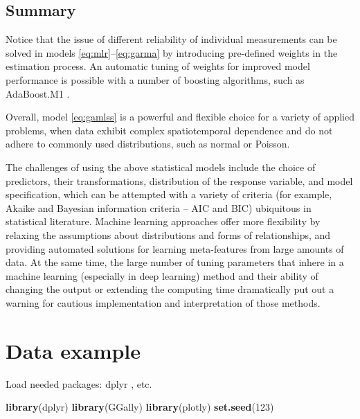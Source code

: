 \documentclass[
]{book}
\newenvironment{Shaded}{\begin{snugshade}}{\end{snugshade}}
\newcommand{\DecValTok}[1]{\textcolor[rgb]{0.00,0.00,0.81}{#1}}
\newcommand{\KeywordTok}[1]{\textcolor[rgb]{0.13,0.29,0.53}{\textbf{#1}}}
\newcommand{\NormalTok}[1]{#1}
\begin{document}
\hypertarget{summary}{%
\subsection{Summary}\label{summary}}

Notice that the issue of different reliability of individual measurements can be solved in models \eqref{eq:mlr}--\eqref{eq:garma} by introducing pre-defined weights in the estimation process. An automatic tuning of weights for improved model performance is possible with a number of boosting algorithms, such as AdaBoost.M1 \citep{Hastie:etal:2009}.

Overall, model \eqref{eq:gamlss} is a powerful and flexible choice for a variety of applied problems, when data exhibit complex spatiotemporal dependence and do not adhere to commonly used distributions, such as normal or Poisson.

The challenges of using the above statistical models include the choice of predictors, their transformations, distribution of the response variable, and model specification, which can be attempted with a variety of criteria (for example, Akaike and Bayesian information criteria -- AIC and BIC) ubiquitous in statistical literature. Machine learning approaches offer more flexibility by relaxing the assumptions about distributions and forms of relationships, and providing automated solutions for learning meta-features from large amounts of data. At the same time, the large number of tuning parameters that inhere in a machine learning (especially in deep learning) method and their ability of changing the output or extending the computing time dramatically put out a warning for cautious implementation and interpretation of those methods.

\hypertarget{data-example}{%
\section{Data example}\label{data-example}}

Load needed packages: dplyr \citep{R-dplyr}, etc.

\begin{Shaded}
\begin{Highlighting}[]
\KeywordTok{library}\NormalTok{(dplyr)}
\KeywordTok{library}\NormalTok{(GGally)}
\KeywordTok{library}\NormalTok{(plotly)}
\KeywordTok{set.seed}\NormalTok{(}\DecValTok{123}\NormalTok{)}
\end{Highlighting}
\end{Shaded}
\end{document}
